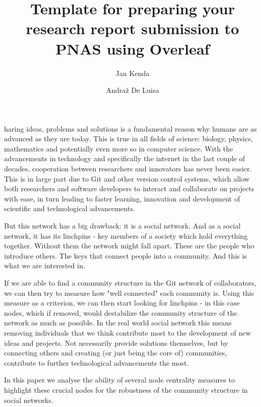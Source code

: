 \documentclass[9pt,twocolumn,twoside]{pnas-new}
\title{Template for preparing your research report submission to PNAS using Overleaf}
\author[a]{Jan Kenda}
\author[b]{Andraž De Luisa}
\affil[a]{University of Ljubljana, Faculty of Computer and Information Science, Ljubljana, Slovenia, jk3977@student.uni-lj.si
}
\affil[b]{University of Ljubljana, Faculty of Computer and Information Science, Ljubljana, Slovenia, ad9366@student.uni-lj.si
}
\begin{document}
\maketitle
\thispagestyle{firststyle}

haring ideas, problems and solutions is a fundamental reason why humans are as advanced as they are today.
This is true in all fields of science: biology, physics, mathematics and potentially even more so in computer science.
With the advancements in technology and specifically the internet in the last couple of decades, 
cooperation between researchers and innovators has never been easier.
This is in large part due to Git and other version control systems, 
which allow both researchers and software developers to interact and collaborate on projects with ease,
in turn leading to faster learning, innovation and development of scientific and technological advancements.

But this network has a big drawback: it is a social network.
And as a social network, it has its linchpins - key members of a society which hold everything together.
Without them the network might fall apart. 
These are the people who introduce others. 
The keys that connect people into a community.
And this is what we are interested in.

If we are able to find a community structure in the Git network of collaborators, 
we can then try to measure how "well connected" each community is.
Using this measure as a criterion, we can then start looking for linchpins - 
in this case nodes, which if removed, would destabilize the community structure of the network as much as possible.
In the real world social network this means removing individuals that we think contribute most to the development of new ideas and projects.
Not necessarily provide solutions themselves, but by connecting others and creating (or just being the core of) communities, contribute to
further technological advancements the most.

In this paper we analyse the ability of several node centrality measures to highlight these crucial nodes for the robustness of the community structure in social networks.
\end{document}
